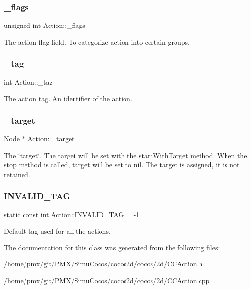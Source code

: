 \subsubsection{\texorpdfstring{\+\_\+flags}{\_flags}}
{\footnotesize\ttfamily unsigned int Action\+::\+\_\+flags\hspace{0.3cm}{\ttfamily [protected]}}

The action flag field. To categorize action into certain groups. \mbox{\label{classAction_a7e04eca811f3f728862300b3e248d7c0}} 
\subsubsection{\texorpdfstring{\+\_\+tag}{\_tag}}
{\footnotesize\ttfamily int Action\+::\+\_\+tag\hspace{0.3cm}{\ttfamily [protected]}}

The action tag. An identifier of the action. \mbox{\label{classAction_ab8c0116a71bb6addcb27b59f70e6a570}} 
\subsubsection{\texorpdfstring{\+\_\+target}{\_target}}
{\footnotesize\ttfamily \hyperlink{classNode}{Node} $\ast$ Action\+::\+\_\+target\hspace{0.3cm}{\ttfamily [protected]}}

The \char`\"{}target\char`\"{}. The target will be set with the \textquotesingle{}start\+With\+Target\textquotesingle{} method. When the \textquotesingle{}stop\textquotesingle{} method is called, target will be set to nil. The target is \textquotesingle{}assigned\textquotesingle{}, it is not \textquotesingle{}retained\textquotesingle{}. \mbox{\label{classAction_a227309d0ca4dcbb1f80a68e3d1fdae71}} 
\subsubsection{\texorpdfstring{I\+N\+V\+A\+L\+I\+D\+\_\+\+T\+AG}{INVALID\_TAG}}
{\footnotesize\ttfamily static const int Action\+::\+I\+N\+V\+A\+L\+I\+D\+\_\+\+T\+AG = -\/1\hspace{0.3cm}{\ttfamily [static]}}

Default tag used for all the actions. 

The documentation for this class was generated from the following files\+:\begin{DoxyCompactItemize}
\item 
/home/pmx/git/\+P\+M\+X/\+Simu\+Cocos/cocos2d/cocos/2d/C\+C\+Action.\+h\item 
/home/pmx/git/\+P\+M\+X/\+Simu\+Cocos/cocos2d/cocos/2d/C\+C\+Action.\+cpp\end{DoxyCompactItemize}
